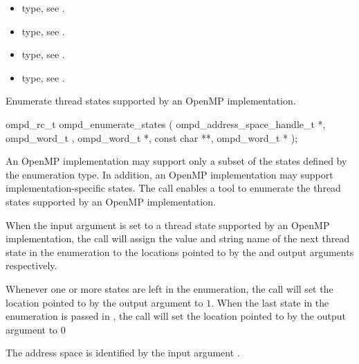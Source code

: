 \crossreferences
\begin{itemize}
  \item {} type, see .
	\item {} type, see .
	\item {} type, see .
	\item {} type, see .
\end{itemize}


\label{subsubsubsec:ompd_enumerate_states}

\summary
Enumerate thread states supported by an OpenMP implementation.

\format
\begin{cspecific}
\begin{ompSyntax}
ompd_rc_t ompd_enumerate_states (
  ompd_address_space_handle_t *,
  ompd_word_t ,
  ompd_word_t *,
  const char **,
  ompd_word_t *
);
\end{ompSyntax}
\end{cspecific}

\descr
An OpenMP implementation may support only a subset of the states defined by
the  enumeration type. In addition, an
OpenMP implementation may support implementation-specific states.
The  call enables a tool to
enumerate the thread states supported by an OpenMP implementation.

When the  input argument is set to a 
thread state supported by an OpenMP implementation,
the call will assign the value and string name of the next thread state in the enumeration
to the locations pointed to by the 
 and  output arguments respectively.

Whenever one or more states are left in the enumeration,
the call will set the location pointed to by the  
output argument to $1$.
When the last state in the enumeration is passed in , 
the call will set the location pointed to by the  output
argument to $0$


\argdesc

The address space is identified by the input argument .

